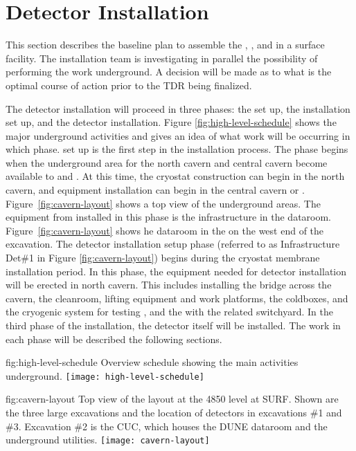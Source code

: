 \section{Detector Installation}
\label{sec:fdsp-tc-inst}

This section describes the baseline plan to assemble the , , and  in a surface facility. The installation team is investigating in parallel the possibility of performing the work underground. A decision will be made as to what is the optimal course of action prior to the TDR being finalized.

The  detector installation will proceed in three phases: the  set up, the installation set up, and the detector installation. Figure \ref{fig:high-level-schedule} 
shows the major underground activities and gives an idea of what work will be occurring in which phase.  set up is the first step in the installation process. The phase begins when the underground area for the north cavern and central cavern become available to  and . At this time, the cryostat construction can begin in the north cavern, and  equipment installation can begin in the central cavern or . Figure~\ref{fig:cavern-layout} shows a top view of the underground areas. The equipment from  installed in this phase is the infrastructure in the  dataroom. Figure~\ref{fig:cavern-layout} shows he dataroom in the  on the west end of the excavation. The detector installation setup phase (referred to as Infrastructure Det\#1 in Figure \ref{fig:cavern-layout}) begins during the cryostat membrane installation period. In this phase, the equipment needed for detector installation will be erected in north cavern. This includes installing the bridge across the cavern, the cleanroom, lifting equipment and work platforms, the coldboxes, and the cryogenic system for testing , and the  with the related switchyard. In the third phase of the installation, the detector itself will be installed. The work in each phase will be described the following sections.

\begin{dunefigure}{fig:high-level-schedule}
  {Overview schedule showing the main activities underground.}
\texttt{[image: high-level-schedule]}
\end{dunefigure}

\begin{dunefigure}{fig:cavern-layout}
  {Top view of the layout at the 4850 level at SURF. Shown are the three large excavations and the location of detectors in excavations \#1 and \#3. Excavation \#2 is the CUC, which houses the DUNE dataroom and the underground utilities.}
\texttt{[image: cavern-layout]}
\end{dunefigure}



